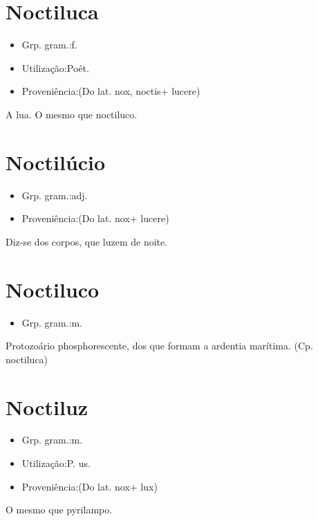 \section{Noctiluca}
\begin{itemize}
\item {Grp. gram.:f.}
\end{itemize}
\begin{itemize}
\item {Utilização:Poét.}
\end{itemize}
\begin{itemize}
\item {Proveniência:(Do lat. \textunderscore nox\textunderscore , \textunderscore noctis\textunderscore  + \textunderscore lucere\textunderscore )}
\end{itemize}
A lua.
O mesmo que \textunderscore noctiluco\textunderscore .
\section{Noctilúcio}
\begin{itemize}
\item {Grp. gram.:adj.}
\end{itemize}
\begin{itemize}
\item {Proveniência:(Do lat. \textunderscore nox\textunderscore  + \textunderscore lucere\textunderscore )}
\end{itemize}
Diz-se dos corpos, que luzem de noite.
\section{Noctiluco}
\begin{itemize}
\item {Grp. gram.:m.}
\end{itemize}
Protozoário phosphorescente, dos que formam a ardentia marítima.
(Cp. \textunderscore noctiluca\textunderscore )
\section{Noctiluz}
\begin{itemize}
\item {Grp. gram.:m.}
\end{itemize}
\begin{itemize}
\item {Utilização:P. us.}
\end{itemize}
\begin{itemize}
\item {Proveniência:(Do lat. \textunderscore nox\textunderscore  + \textunderscore lux\textunderscore )}
\end{itemize}
O mesmo que \textunderscore pyrilampo\textunderscore .
